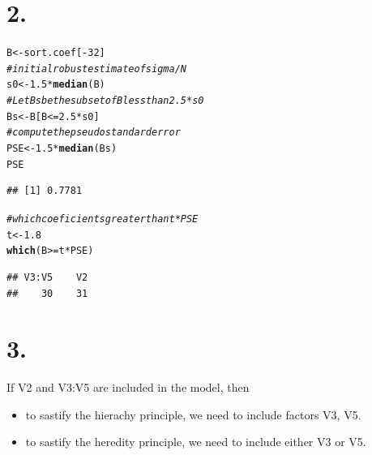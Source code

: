 \documentclass{article}\usepackage[]{graphicx}\usepackage[]{color}
\makeatletter
\newcommand{\hlnum}[1]{\textcolor[rgb]{0.686,0.059,0.569}{#1}}%
\newcommand{\hlcom}[1]{\textcolor[rgb]{0.678,0.584,0.686}{\textit{#1}}}%
\newcommand{\hlopt}[1]{\textcolor[rgb]{0,0,0}{#1}}%
\newcommand{\hlstd}[1]{\textcolor[rgb]{0.345,0.345,0.345}{#1}}%
\newcommand{\hlkwb}[1]{\textcolor[rgb]{0.69,0.353,0.396}{#1}}%
\newcommand{\hlkwd}[1]{\textcolor[rgb]{0.737,0.353,0.396}{\textbf{#1}}}%
\newenvironment{kframe}{%
 \def\at@end@of@kframe{}%
 \ifinner\ifhmode%
  \def\at@end@of@kframe{\end{minipage}}%
  \begin{minipage}{\columnwidth}%
 \fi\fi%
 \def\FrameCommand##1{\hskip\@totalleftmargin \hskip-\fboxsep
 \colorbox{shadecolor}{##1}\hskip-\fboxsep
     \hskip-\linewidth \hskip-\@totalleftmargin \hskip\columnwidth}%
 \MakeFramed {\advance\hsize-\width
   \@totalleftmargin\z@ \linewidth\hsize
   \@setminipage}}%
 {\par\unskip\endMakeFramed%
 \at@end@of@kframe}
\newenvironment{knitrout}{}{} %
\makeatother
\begin{document}
\section*{2.}
\begin{knitrout}
\color{fgcolor}\begin{kframe}
\begin{alltt}
\hlstd{B} \hlkwb{<-} \hlstd{sort.coef[}\hlopt{-}\hlnum{32}\hlstd{]}
\hlcom{# initial robust estimate of sigma/N}
\hlstd{s0} \hlkwb{<-} \hlnum{1.5}\hlopt{*}\hlkwd{median}\hlstd{(B)}
\hlcom{# Let Bs be the subset of B less than 2.5 * s0}
\hlstd{Bs} \hlkwb{<-} \hlstd{B[B}\hlopt{<=}\hlnum{2.5}\hlopt{*}\hlstd{s0]}
\hlcom{# compute the pseudo standard error}
\hlstd{PSE} \hlkwb{<-} \hlnum{1.5} \hlopt{*} \hlkwd{median}\hlstd{(Bs)}
\hlstd{PSE}
\end{alltt}
\begin{verbatim}
## [1] 0.7781
\end{verbatim}
\begin{alltt}
\hlcom{# which coeficients greater  than t*PSE}
\hlstd{t} \hlkwb{<-} \hlnum{1.8}
\hlkwd{which}\hlstd{(B}\hlopt{>=}\hlstd{t}\hlopt{*}\hlstd{PSE)}
\end{alltt}
\begin{verbatim}
## V3:V5    V2 
##    30    31
\end{verbatim}
\end{kframe}
\end{knitrout}

\section*{3.}
If V2 and V3:V5 are included in the model, then 
\begin{itemize}
\item to sastify the hierachy principle,  we need to include factors V3, V5.
\item to sastify the heredity principle, we need to include either V3 or V5.
\end{itemize}
\end{document}
